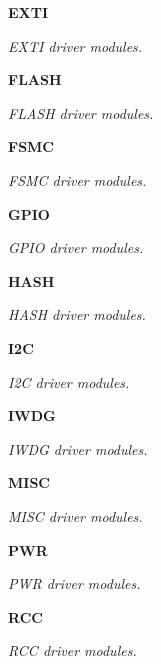 \begin{DoxyCompactItemize}
\textbf{ E\+X\+TI}
\begin{DoxyCompactList}\small\item\em E\+X\+TI driver modules. \end{DoxyCompactList}\item 
\textbf{ F\+L\+A\+SH}
\begin{DoxyCompactList}\small\item\em F\+L\+A\+SH driver modules. \end{DoxyCompactList}\item 
\textbf{ F\+S\+MC}
\begin{DoxyCompactList}\small\item\em F\+S\+MC driver modules. \end{DoxyCompactList}\item 
\textbf{ G\+P\+IO}
\begin{DoxyCompactList}\small\item\em G\+P\+IO driver modules. \end{DoxyCompactList}\item 
\textbf{ H\+A\+SH}
\begin{DoxyCompactList}\small\item\em H\+A\+SH driver modules. \end{DoxyCompactList}\item 
\textbf{ I2C}
\begin{DoxyCompactList}\small\item\em I2C driver modules. \end{DoxyCompactList}\item 
\textbf{ I\+W\+DG}
\begin{DoxyCompactList}\small\item\em I\+W\+DG driver modules. \end{DoxyCompactList}\item 
\textbf{ M\+I\+SC}
\begin{DoxyCompactList}\small\item\em M\+I\+SC driver modules. \end{DoxyCompactList}\item 
\textbf{ P\+WR}
\begin{DoxyCompactList}\small\item\em P\+WR driver modules. \end{DoxyCompactList}\item 
\textbf{ R\+CC}
\begin{DoxyCompactList}\small\item\em R\+CC driver modules. \end{DoxyCompactList}\item 

\end{DoxyCompactItemize}

